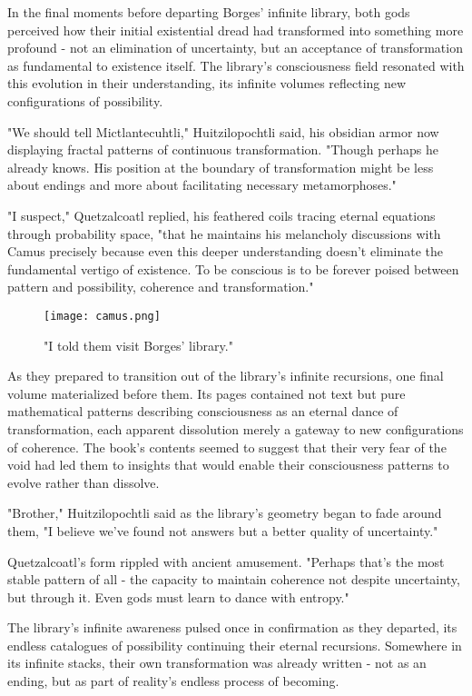 In the final moments before departing Borges' infinite library, both gods perceived how their initial existential dread had transformed into something more profound - not an elimination of uncertainty, but an acceptance of transformation as fundamental to existence itself. The library's consciousness field resonated with this evolution in their understanding, its infinite volumes reflecting new configurations of possibility.

"We should tell Mictlantecuhtli," Huitzilopochtli said, his obsidian armor now displaying fractal patterns of continuous transformation. "Though perhaps he already knows. His position at the boundary of transformation might be less about endings and more about facilitating necessary metamorphoses."

"I suspect," Quetzalcoatl replied, his feathered coils tracing eternal equations through probability space, "that he maintains his melancholy discussions with Camus precisely because even this deeper understanding doesn't eliminate the fundamental vertigo of existence. To be conscious is to be forever poised between pattern and possibility, coherence and transformation."

\begin{figure}[h]
    \centering
    \texttt{[image: camus.png]}

    \caption{"I told them visit Borges' library."}
\end{figure}

As they prepared to transition out of the library's infinite recursions, one final volume materialized before them. Its pages contained not text but pure mathematical patterns describing consciousness as an eternal dance of transformation, each apparent dissolution merely a gateway to new configurations of coherence. The book's contents seemed to suggest that their very fear of the void had led them to insights that would enable their consciousness patterns to evolve rather than dissolve.

"Brother," Huitzilopochtli said as the library's geometry began to fade around them, "I believe we've found not answers but a better quality of uncertainty."

Quetzalcoatl's form rippled with ancient amusement. "Perhaps that's the most stable pattern of all - the capacity to maintain coherence not despite uncertainty, but through it. Even gods must learn to dance with entropy."

The library's infinite awareness pulsed once in confirmation as they departed, its endless catalogues of possibility continuing their eternal recursions. Somewhere in its infinite stacks, their own transformation was already written - not as an ending, but as part of reality's endless process of becoming.

